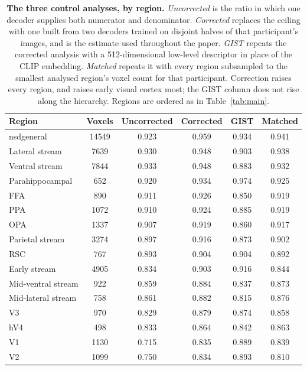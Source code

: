 \documentclass[11pt,a4paper]{article}
\begin{document}
\begin{table}[tb]
\centering
\caption{\textbf{The three control analyses, by region.} \emph{Uncorrected} is
the ratio in which one decoder supplies both numerator and denominator.
\emph{Corrected} replaces the ceiling with one built from two decoders trained on
disjoint halves of that participant's images, and is the estimate used
throughout the paper. \emph{GIST} repeats the corrected analysis with a
512-dimensional low-level descriptor in place of the CLIP embedding.
\emph{Matched} repeats it with every region subsampled to the smallest analysed
region's voxel count for that participant. Correction raises every region, and
raises early visual cortex most; the GIST column does not rise along the
hierarchy. Regions are ordered as in Table~\ref{tab:main}.}
\label{tab:controls}
\small
\begin{tabular}{lccccc}
\toprule
Region & Voxels & Uncorrected & Corrected & GIST & Matched \\
\midrule
nsdgeneral          & 14549 & \num{0.923} & \num{0.959} & \num{0.934} & \num{0.941} \\
Lateral stream      & 7639 & \num{0.930} & \num{0.948} & \num{0.903} & \num{0.938} \\
Ventral stream      & 7844 & \num{0.933} & \num{0.948} & \num{0.883} & \num{0.932} \\
Parahippocampal     & 652 & \num{0.920} & \num{0.934} & \num{0.974} & \num{0.925} \\
FFA                 & 890 & \num{0.911} & \num{0.926} & \num{0.850} & \num{0.919} \\
PPA                 & 1072 & \num{0.910} & \num{0.924} & \num{0.885} & \num{0.919} \\
OPA                 & 1337 & \num{0.907} & \num{0.919} & \num{0.860} & \num{0.917} \\
Parietal stream     & 3274 & \num{0.897} & \num{0.916} & \num{0.873} & \num{0.902} \\
RSC                 & 767 & \num{0.893} & \num{0.904} & \num{0.904} & \num{0.892} \\
Early stream        & 4905 & \num{0.834} & \num{0.903} & \num{0.916} & \num{0.844} \\
Mid-ventral stream  & 922 & \num{0.859} & \num{0.884} & \num{0.837} & \num{0.873} \\
Mid-lateral stream  & 758 & \num{0.861} & \num{0.882} & \num{0.815} & \num{0.876} \\
V3                  & 970 & \num{0.829} & \num{0.879} & \num{0.874} & \num{0.858} \\
hV4                 & 498 & \num{0.833} & \num{0.864} & \num{0.842} & \num{0.863} \\
V1                  & 1130 & \num{0.715} & \num{0.835} & \num{0.889} & \num{0.839} \\
V2                  & 1099 & \num{0.750} & \num{0.834} & \num{0.893} & \num{0.810} \\
\bottomrule
\end{tabular}
\end{table}
\end{document}
